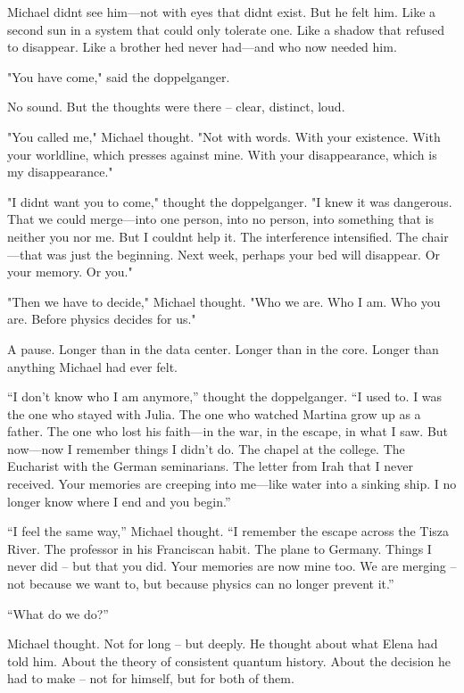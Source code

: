 \documentclass[
]{article}
\begin{document}
Michael didn\textquotesingle t see him---not with eyes that didn\textquotesingle t exist. But he felt him. Like a second sun in a system that could only tolerate one. Like a shadow that refused to disappear. Like a brother he\textquotesingle d never had---and who now needed him.

"You have come," said the doppelganger.

No sound. But the thoughts were there -- clear, distinct, loud.

"You called me," Michael thought. "Not with words. With your existence. With your worldline, which presses against mine. With your disappearance, which is my disappearance."

"I didn\textquotesingle t want you to come," thought the doppelganger. "I knew it was dangerous. That we could merge---into one person, into no person, into something that is neither you nor me. But I couldn\textquotesingle t help it. The interference intensified. The chair---that was just the beginning. Next week, perhaps your bed will disappear. Or your memory. Or you."

"Then we have to decide," Michael thought. "Who we are. Who I am. Who you are. Before physics decides for us."

A pause. Longer than in the data center. Longer than in the core. Longer than anything Michael had ever felt.

``I don't know who I am anymore,'' thought the doppelganger. ``I used to. I was the one who stayed with Julia. The one who watched Martina grow up as a father. The one who lost his faith---in the war, in the escape, in what I saw. But now---now I remember things I didn't do. The chapel at the college. The Eucharist with the German seminarians. The letter from Irah that I never received. Your memories are creeping into me---like water into a sinking ship. I no longer know where I end and you begin.''

``I feel the same way,'' Michael thought. ``I remember the escape across the Tisza River. The professor in his Franciscan habit. The plane to Germany. Things I never did -- but that you did. Your memories are now mine too. We are merging -- not because we want to, but because physics can no longer prevent it.''

``What do we do?''

Michael thought. Not for long -- but deeply. He thought about what Elena had told him. About the theory of consistent quantum history. About the decision he had to make -- not for himself, but for both of them.
\end{document}
